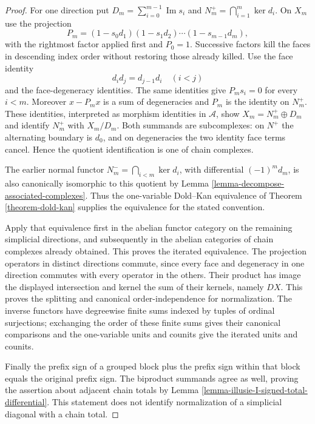 \begin{proof}
For one direction put
$D_m=\sum_{i=0}^{m-1}\operatorname{Im}s_i$ and
$N^+_m=\bigcap_{i=1}^m\ker d_i$. On $X_m$ use the projection
\[
 P_m=(1-s_0d_1)(1-s_1d_2)\cdots(1-s_{m-1}d_m),
\]
with the rightmost factor applied first and $P_0=1$.
Successive factors kill the faces in descending index order without
restoring those already killed. Use the face identity
\[
 d_i d_j=d_{j-1}d_i\quad(i<j)
\]
and the face-degeneracy identities. The same identities give $P_ms_i=0$
for every $i<m$. Moreover $x-P_mx$ is a sum of degeneracies and $P_m$
is the identity on $N^+_m$. These identities, interpreted as morphism
identities in $\mathcal A$, show
$X_m=N^+_m\oplus D_m$ and identify $N^+_m$ with $X_m/D_m$.
Both summands are subcomplexes: on $N^+$ the alternating boundary is $d_0$,
and on degeneracies the two identity face terms cancel. Hence the quotient
identification is one of chain complexes.

The earlier normal functor $N^-_m=\bigcap_{i<m}\ker d_i$, with differential
$(-1)^m d_m$, is also canonically isomorphic to this quotient by
Lemma \ref{lemma-decompose-associated-complexes}. Thus the one-variable
Dold--Kan equivalence of Theorem \ref{theorem-dold-kan} supplies the
equivalence for the stated convention.

Apply that equivalence first in the abelian functor category on the
remaining simplicial directions, and subsequently in the abelian categories
of chain complexes already obtained. This proves the iterated equivalence.
The projection operators in distinct directions commute, since every
face and degeneracy in one direction commutes with every operator in the
others. Their product has image the displayed intersection and kernel
the sum of their kernels, namely $DX$. This proves the splitting and
canonical order-independence for normalization. The inverse functors have
degreewise finite sums indexed by tuples of ordinal surjections; exchanging
the order of these finite sums gives their canonical comparisons and the
one-variable units and counits give the iterated units and counits.

Finally the prefix sign of a grouped block plus the prefix sign within
that block equals the original prefix sign. The biproduct summands agree
as well, proving the assertion about adjacent chain totals by
Lemma \ref{lemma-illusie-I-signed-total-differential}. This statement does
not identify normalization of a simplicial diagonal with a chain total.
\end{proof}

